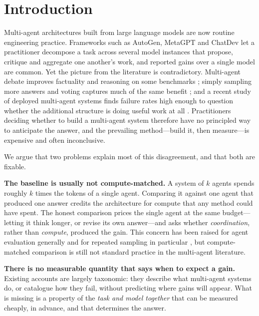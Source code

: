 \section{Introduction}

Multi-agent architectures built from large language models are now routine
engineering practice. Frameworks such as AutoGen, MetaGPT and ChatDev
\citep{wu2023autogen,hong2024metagpt,qian2024chatdev} let a practitioner
decompose a task across several model instances that propose, critique and
aggregate one another's work, and reported gains over a single model are
common. Yet the picture from the literature is contradictory. Multi-agent
debate improves factuality and reasoning on some benchmarks
\citep{du2023debate}; simply sampling more answers and voting captures much of
the same benefit \citep{wang2023selfconsistency,li2024moreagents}; and a recent
study of deployed multi-agent systems finds failure rates high enough to
question whether the additional structure is doing useful work at all
\citep{cemri2025why}. Practitioners deciding whether to build a multi-agent
system therefore have no principled way to anticipate the answer, and the
prevailing method---build it, then measure---is expensive and often
inconclusive.

We argue that two problems explain most of this disagreement, and that both
are fixable.

\textbf{The baseline is usually not compute-matched.} A system of $k$ agents
spends roughly $k$ times the tokens of a single agent. Comparing it against one
agent that produced one answer credits the architecture for compute that any
method could have spent. The honest comparison prices the single agent at the
same budget---letting it think longer, or revise its own answer---and asks
whether \emph{coordination}, rather than \emph{compute}, produced the gain.
This concern has been raised for agent evaluation generally
\citep{kapoor2024agents} and for repeated sampling in particular
\citep{brown2024monkeys,snell2024scaling,stroebl2024limits}, but
compute-matched comparison is still not standard practice in the multi-agent
literature.

\textbf{There is no measurable quantity that says when to expect a gain.}
Existing accounts are largely taxonomic: they describe what multi-agent systems
do, or catalogue how they fail, without predicting where gains will appear.
What is missing is a property of the \emph{task and model together} that can be
measured cheaply, in advance, and that determines the answer.

